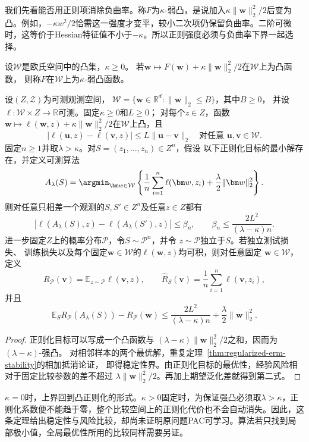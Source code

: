 我们先看能否用正则项消除负曲率。称$F$为$\kappa$-弱凸，是说加入$\kappa\|\bm w\|_2^2/2$后变为凸。例如，$-\kappa w^2/2$恰需这一强度才变平，较小二次项仍保留负曲率。二阶可微时，这等价于Hessian特征值不小于$-\kappa$。所以正则强度必须与负曲率下界一起选择。

\begin{definition}[弱凸函数]
\label{def:weakly-convex}
设$\mathcal W$是欧氏空间中的凸集，$\kappa\geq0$。
若$\bm w\mapsto F(\bm w)+\kappa\|\bm w\|_2^2/2$在$\mathcal W$上为凸函数，
则称$F$在$\mathcal W$上为$\kappa$-弱凸函数。
\end{definition}

\begin{theorem}[弱凸损失的正则化稳定性]
\label{thm:weakly-convex-regularization}
设$(Z,\mathcal Z)$为可测观测空间，
$\mathcal W=\{\bm w\in\mathbb R^d:\|\bm w\|_2\leq B\}$，其中$B\geq0$，
并设$\ell:\mathcal W\times Z\to\mathbb R$可测。固定$\kappa\geq0$和$L\geq0$；
对每个$z\in Z$，函数
$\bm w\mapsto\ell(\bm w,z)+\kappa\|\bm w\|_2^2/2$在$\mathcal W$上凸，且
\[
 |\ell(\bm u,z)-\ell(\bm v,z)|\leq L\|\bm u-\bm v\|_2
 \quad\text{对任意 }\bm u,\bm v\in\mathcal W.
\]
固定$n\geq1$并取$\lambda>\kappa$。对$S=(z_1,\ldots,z_n)\in Z^n$，假设
以下正则化目标的最小解存在，并定义可测算法
\[
 A_\lambda(S)=\argmin_{\bm w\in\mathcal W}
 \left\{\frac1n\sum_{i=1}^n\ell(\bm w,z_i)
 +\frac\lambda2\|\bm w\|_2^2\right\}.
\]
则对任意只相差一个观测的$S,S'\in Z^n$及任意$z\in Z$都有
\[
 |\ell(A_\lambda(S),z)-\ell(A_\lambda(S'),z)|
 \leq\beta_n,\qquad
 \beta_n\leq\frac{2L^2}{(\lambda-\kappa)n}.
\]
进一步固定$Z$上的概率分布$\mathcal P$，令$S\sim\mathcal P^n$，并令
$z\sim\mathcal P$独立于$S$。若独立测试损失、
训练损失以及每个固定$\bm w\in\mathcal W$的$\ell(\bm w,z)$均可积，则对任意固定
$\bm w\in\mathcal W$，定义
\[
 R_{\mathcal P}(\bm v)=\mathbb E_{z\sim\mathcal P}\ell(\bm v,z),
 \qquad
 \hat R_S(\bm v)=\frac1n\sum_{i=1}^n\ell(\bm v,z_i),
\]
并且
\[
 \mathbb E_S R_{\mathcal P}(A_\lambda(S))-R_{\mathcal P}(\bm w)
 \leq\frac{2L^2}{(\lambda-\kappa)n}+\frac\lambda2\|\bm w\|_2^2.
\]
\end{theorem}
\begin{proof}
正则化目标可以写成一个凸函数与
$(\lambda-\kappa)\|\bm w\|_2^2/2$之和，因而为$(\lambda-\kappa)$-强凸。
对相邻样本的两个最优解，重复定理~\ref{thm:regularized-erm-stability}的相加抵消论证，
即得稳定性界。由正则化目标的最优性，经验风险相对于固定比较参数的差不超过
$\lambda\|\bm w\|_2^2/2$。再加上期望泛化差就得到第二式。
\end{proof}

$\kappa=0$时，上界回到凸正则化的形式。$\kappa>0$固定时，为保证强凸必须取$\lambda>\kappa$，正则化系数便不能趋于零，整个比较空间上的正则化代价也不会自动消失。因此，这条定理给出稳定性与风险比较，却尚未证明原问题PAC可学习。算法若只找到局部极小值，全局最优性所用的比较同样需要另证。

